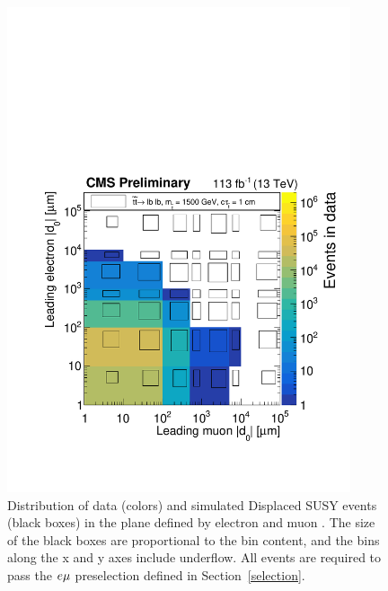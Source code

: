 \begin{figure}
\centering
\includegraphics[width=0.9\textwidth]{figures/results/d0vsd0_emu_withSignal_CMSPreliminary.pdf}
\caption{Distribution of data (colors) and simulated Displaced SUSY events (black boxes) in the plane defined by electron \ad and muon \ad. The size of the black boxes are proportional to the bin content, and the bins along the x and y axes include underflow. All events are required to pass the $e{\mu}$ preselection defined in Section~\ref{selection}.} 
\label{d0_discriminating_power}
\end{figure}
